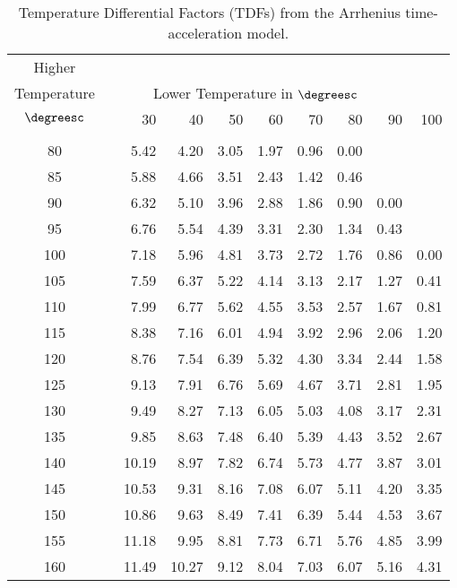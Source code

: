 \begin{table}
\caption{Temperature Differential Factors (TDFs) from the Arrhenius 
time-acceleration model.}
\centering\small
\begin{tabular} { crrrrrrrrr}
\\[-.5ex]
\multicolumn{1}{c}{Higher}\\
\multicolumn{1}{c}{Temperature}& \multicolumn{8}{c}{Lower Temperature in
$\degreesc$}\\
\cline{3-10}
$\degreesc$       & & 30 & 40 & 50 & 60 & 70 & 80 & 90 & 100 \\ 
\cline{3-10}\\
 80 &&   5.42 &  4.20 &  3.05  & 1.97 &  0.96 &  0.00 &       &   \\  
 85 &&   5.88 &  4.66 &  3.51 &  2.43 &  1.42 &  0.46 &       &    \\  
 90 &&   6.32 &  5.10 &  3.96 &  2.88 &  1.86 &  0.90 &  0.00 &   \\   
 95 &&   6.76 &  5.54 &  4.39 &  3.31 &  2.30 &  1.34 &  0.43 &    \\  
100 &&   7.18 &  5.96 &  4.81 &  3.73 &  2.72 &  1.76 &  0.86 &  0.00 \\[.5ex] 
105 &&   7.59 &  6.37 &  5.22 &  4.14 &  3.13 &  2.17 &  1.27 &  0.41 \\ 
110 &&   7.99 &  6.77 &  5.62 &  4.55 &  3.53 &  2.57 &  1.67 &  0.81 \\ 
115 &&   8.38 &  7.16 &  6.01 &  4.94 &  3.92 &  2.96 &  2.06 &  1.20 \\ 
120 &&   8.76 &  7.54 &  6.39 &  5.32 &  4.30 &  3.34 &  2.44 &  1.58 \\ 
125 &&   9.13 &  7.91&   6.76 &  5.69 &  4.67 &  3.71 &  2.81 &  1.95 \\[.5ex] 
130 &&   9.49 &  8.27 &  7.13 &  6.05 &  5.03 &  4.08 &  3.17 &  2.31 \\ 
135 &&   9.85 &  8.63 &  7.48 &  6.40 &  5.39 &  4.43 &  3.52 &  2.67 \\ 
140 &&  10.19 &  8.97 &  7.82 &  6.74 &  5.73 &  4.77 &  3.87 &  3.01 \\ 
145 &&  10.53 &  9.31 &  8.16 &  7.08 &  6.07 &  5.11 &  4.20 &  3.35 \\ 
150 &&  10.86 &  9.63 &  8.49 &  7.41 &  6.39 &  5.44 &  4.53 &  3.67 \\[.5ex] 
155 &&  11.18 &  9.95 &  8.81 &  7.73 &  6.71 &  5.76 &  4.85 &  3.99 \\ 
160 &&  11.49&  10.27 &  9.12 &  8.04 &  7.03 &  6.07 &  5.16 &  4.31 \\ 

\end{tabular}
\end{table}
